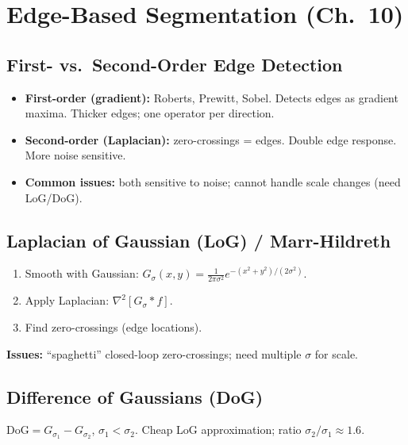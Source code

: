 \documentclass[10pt]{article}
\begin{document}
\section{Edge-Based Segmentation (Ch.~10)}

\subsection{First- vs.\ Second-Order Edge Detection}
\begin{itemize}
  \item \textbf{First-order (gradient):} Roberts, Prewitt, Sobel. Detects edges as gradient maxima. Thicker edges; one operator per direction.
  \item \textbf{Second-order (Laplacian):} zero-crossings = edges. Double edge response. More noise sensitive.
  \item \textbf{Common issues:} both sensitive to noise; cannot handle scale changes (need LoG/DoG).
\end{itemize}

\subsection{Laplacian of Gaussian (LoG) / Marr-Hildreth}
\begin{tcolorbox}[procbox]
\begin{enumerate}
  \item Smooth with Gaussian: $G_\sigma(x,y) = \tfrac{1}{2\pi\sigma^2}e^{-(x^2+y^2)/(2\sigma^2)}$.
  \item Apply Laplacian: $\nabla^2[G_\sigma * f]$.
  \item Find zero-crossings (edge locations).
\end{enumerate}
\textbf{Issues:} ``spaghetti'' closed-loop zero-crossings; need multiple $\sigma$ for scale.
\end{tcolorbox}

\subsection{Difference of Gaussians (DoG)}
\(\text{DoG} = G_{\sigma_1} - G_{\sigma_2}\), $\sigma_1 < \sigma_2$. Cheap LoG approximation; ratio $\sigma_2/\sigma_1 \approx 1.6$.
\end{document}
